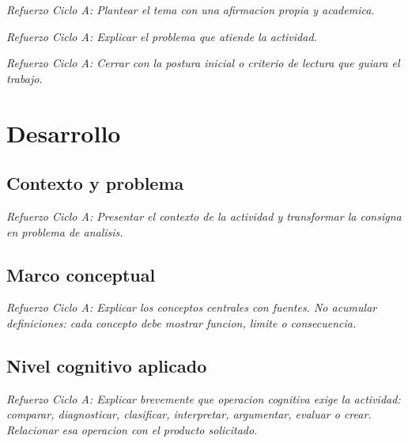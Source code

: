 \documentclass[
	spanish,
	letterpaper, oneside
]{article}
\begin{document}
\textit{Refuerzo Ciclo A: Plantear el tema con una afirmacion propia y academica.}

\textit{Refuerzo Ciclo A: Explicar el problema que atiende la actividad.}

\textit{Refuerzo Ciclo A: Cerrar con la postura inicial o criterio de lectura que guiara el trabajo.}

%
%
\section{Desarrollo}

\subsection{Contexto y problema}

\textit{Refuerzo Ciclo A: Presentar el contexto de la actividad y transformar la consigna en problema de analisis.}

\subsection{Marco conceptual}

\textit{Refuerzo Ciclo A: Explicar los conceptos centrales con fuentes. No acumular definiciones: cada concepto debe mostrar funcion, limite o consecuencia.}

\subsection{Nivel cognitivo aplicado}

\textit{Refuerzo Ciclo A: Explicar brevemente que operacion cognitiva exige la actividad: comparar, diagnosticar, clasificar, interpretar, argumentar, evaluar o crear. Relacionar esa operacion con el producto solicitado.}
\end{document}

